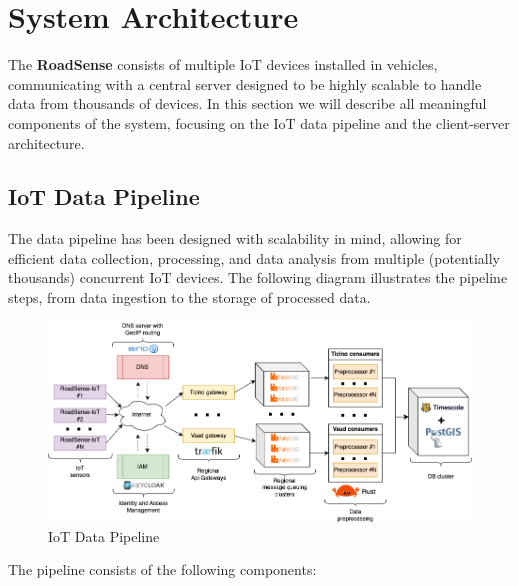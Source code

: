 \section{System Architecture}

The \textbf{RoadSense} consists of multiple IoT devices installed in vehicles, communicating with a central server designed to be highly scalable to handle data from thousands of devices. In this section we will describe all meaningful components of the system, focusing on the IoT data pipeline and the client-server architecture.

\subsection{IoT Data Pipeline}

The data pipeline has been designed with scalability in mind, allowing for efficient data collection, processing, and data analysis from multiple (potentially thousands) concurrent IoT devices. The following diagram illustrates the pipeline steps, from data ingestion to the storage of processed data.

\begin{figure}[H]
	\centering
	\includegraphics[width=\textwidth]{../../assets/diagrams/iot_data_pipeline/iot_data_pipeline.png}
	\caption{IoT Data Pipeline}
\end{figure}

The pipeline consists of the following components:

